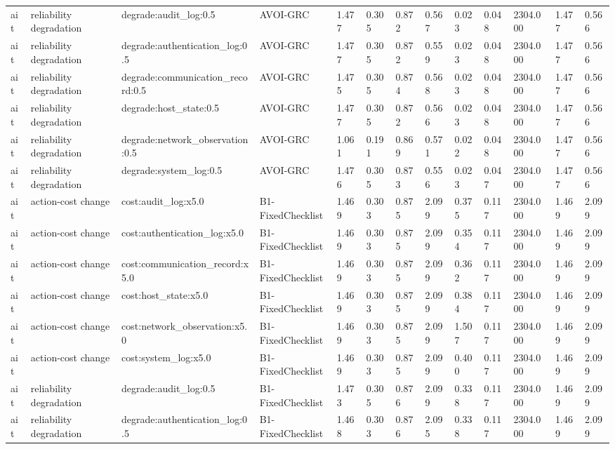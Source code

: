 \begin{table}[!ht]
{\begin{tabular}{lllllllllllll}
ait & reliability degradation & degrade:audit\_log:0.5 & AVOI-GRC & 1.477 & 0.305 & 0.872 & 0.567 & 0.023 & 0.048 & 2304.000 & 1.477 & 0.566 \\
ait & reliability degradation & degrade:authentication\_log:0.5 & AVOI-GRC & 1.477 & 0.305 & 0.872 & 0.559 & 0.023 & 0.048 & 2304.000 & 1.477 & 0.566 \\
ait & reliability degradation & degrade:communication\_record:0.5 & AVOI-GRC & 1.475 & 0.305 & 0.874 & 0.568 & 0.023 & 0.048 & 2304.000 & 1.477 & 0.566 \\
ait & reliability degradation & degrade:host\_state:0.5 & AVOI-GRC & 1.477 & 0.305 & 0.872 & 0.566 & 0.023 & 0.048 & 2304.000 & 1.477 & 0.566 \\
ait & reliability degradation & degrade:network\_observation:0.5 & AVOI-GRC & 1.061 & 0.191 & 0.869 & 0.571 & 0.022 & 0.048 & 2304.000 & 1.477 & 0.566 \\
ait & reliability degradation & degrade:system\_log:0.5 & AVOI-GRC & 1.476 & 0.305 & 0.873 & 0.556 & 0.023 & 0.047 & 2304.000 & 1.477 & 0.566 \\
ait & action-cost change & cost:audit\_log:x5.0 & B1-FixedChecklist & 1.469 & 0.303 & 0.875 & 2.099 & 0.375 & 0.117 & 2304.000 & 1.469 & 2.099 \\
ait & action-cost change & cost:authentication\_log:x5.0 & B1-FixedChecklist & 1.469 & 0.303 & 0.875 & 2.099 & 0.354 & 0.117 & 2304.000 & 1.469 & 2.099 \\
ait & action-cost change & cost:communication\_record:x5.0 & B1-FixedChecklist & 1.469 & 0.303 & 0.875 & 2.099 & 0.362 & 0.117 & 2304.000 & 1.469 & 2.099 \\
ait & action-cost change & cost:host\_state:x5.0 & B1-FixedChecklist & 1.469 & 0.303 & 0.875 & 2.099 & 0.384 & 0.117 & 2304.000 & 1.469 & 2.099 \\
ait & action-cost change & cost:network\_observation:x5.0 & B1-FixedChecklist & 1.469 & 0.303 & 0.875 & 2.099 & 1.507 & 0.117 & 2304.000 & 1.469 & 2.099 \\
ait & action-cost change & cost:system\_log:x5.0 & B1-FixedChecklist & 1.469 & 0.303 & 0.875 & 2.099 & 0.400 & 0.117 & 2304.000 & 1.469 & 2.099 \\
ait & reliability degradation & degrade:audit\_log:0.5 & B1-FixedChecklist & 1.473 & 0.305 & 0.876 & 2.099 & 0.338 & 0.117 & 2304.000 & 1.469 & 2.099 \\
ait & reliability degradation & degrade:authentication\_log:0.5 & B1-FixedChecklist & 1.468 & 0.303 & 0.876 & 2.095 & 0.338 & 0.117 & 2304.000 & 1.469 & 2.099 \\

\end{tabular}}
\end{table}
